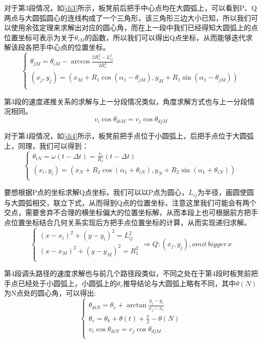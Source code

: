 \documentclass[withoutpreface,bwprint]{cumcmthesis} %
\begin{document}
对于第3段情况，如\cref{di3}所示，板凳前后把手中心点均在大圆弧上，可以看到P、Q两点与大圆弧圆心的连线构成了一个三角形，该三角形三边大小已知，所以我们可以使用余弦定理来求解出对应的圆心角，而在上一段中我们已经得知大圆弧上的点位置坐标可表示为关于$\theta_{iM}$的函数，所以我们可以得出Q点坐标，从而能够迭代求解该段各把手中心点的位置坐标。
\begin{equation}
    \begin{cases}
    \theta_{jM} = \theta_{iM} - \arccos{\frac{2R_1^2-L_{ij}^2}{2R_1^2}}\\
    (x_j,y_j) = (x_M+R_1\cos{(\alpha_1-\theta_{jM})},y_M+R_1\sin{(\alpha_1-\theta_{jM})})\\
    \end{cases}
    \label{eq26}
\end{equation}

第3段的速度递推关系的求解与上一分段情况类似，角度求解方式也与上一分段情况相同。
\begin{equation}
    v_i\cos{\theta_{diM}} = v_j\cos{\theta_{djM}}
    \label{eq27}
\end{equation}

对于第4段情况，如\cref{di4}所示，板凳前把手点位于小圆弧上，后把手点位于大圆弧上，同理，我们可以得到：
\begin{equation}
    \begin{cases}
    \theta_{iN} = \omega(t-\Delta t) = \frac{v_i}{R_2}(t-\Delta t)\\
    (x_i,y_i) = (x_N+R_2\cos{(\alpha_1+\theta_{iN})},y_N+R_2\sin{(\alpha_1+\theta_{iN})})\\
    \end{cases}
    \label{eq28}
\end{equation}

要想根据P点的坐标求解Q点坐标，我们可以以P点为圆心，$L_{ij}$为半径，画圆使圆与大圆弧相交，联立下式，从而得到Q点的位置坐标，注意这里我们可能会有两个交点，需要舍弃不合理的横坐标偏大的位置坐标解，从而本段上也可根据前方把手点位置坐标结合几何关系实现后方把手点位置坐标的计算，从而实现递归求解。
\begin{equation}
    \begin{cases}
    (x-x_i)^2+(y-y_i)^2 = L_{ij}^2\\
    (x-x_M)^2+(y-y_M)^2 = R_1^2\\
    \end{cases}
    \Rightarrow
    Q:(x_j,y_j),omit\,bigger\,x
    \label{eq29}
\end{equation}

第4段调头路径的速度求解也与前几个路径段类似，不同之处在于第4段时板凳前把手点已经处于小圆弧上，小圆弧上的$\theta_v$推导结论与大圆弧上略有不同，其中$\theta(N)$为N点处的圆心角，可以得出:
\begin{equation}
    \begin{cases}
    \theta_{diN} = \theta_v + \arctan{\frac{y_j-y_i}{x_j-x_i}}\\
    \theta_v = \theta_k + \theta(t) +\frac{\pi}{2} - \theta(N)\\
    v_i\cos{\theta_{diN}} = v_j\cos{\theta_{djM}}\\
    \end{cases}
    \label{eq30}
\end{equation}
\end{document}
